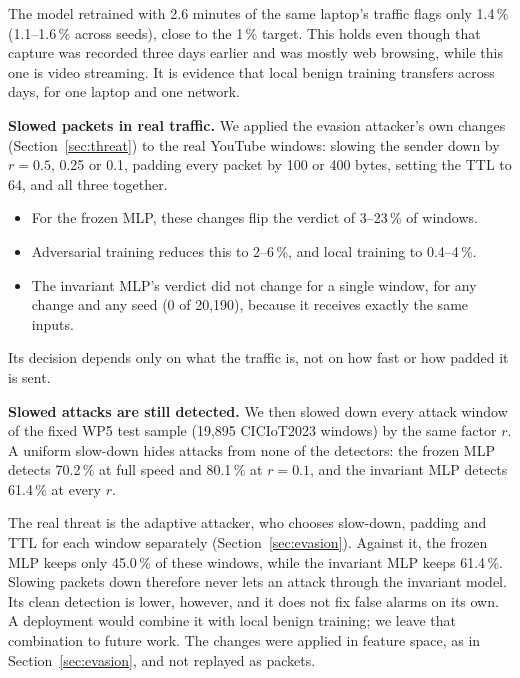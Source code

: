 \documentclass[conference]{IEEEtran}
\begin{document}
The model retrained with 2.6 minutes of the same laptop's traffic flags only 1.4\,\% (1.1--1.6\,\% across seeds), close to the 1\,\% target. This holds even though that capture was recorded three days earlier and was mostly web browsing, while this one is video streaming. It is evidence that local benign training transfers across days, for one laptop and one network.

\textbf{Slowed packets in real traffic.} We applied the evasion attacker's own changes (Section~\ref{sec:threat}) to the real YouTube windows: slowing the sender down by $r=0.5$, 0.25 or 0.1, padding every packet by 100 or 400 bytes, setting the TTL to 64, and all three together.
\begin{itemize}
\item For the frozen MLP, these changes flip the verdict of 3--23\,\% of windows.
\item Adversarial training reduces this to 2--6\,\%, and local training to 0.4--4\,\%.
\item The invariant MLP's verdict did not change for a single window, for any change and any seed (0 of 20,190), because it receives exactly the same inputs.
\end{itemize}
Its decision depends only on what the traffic is, not on how fast or how padded it is sent.

\textbf{Slowed attacks are still detected.} We then slowed down every attack window of the fixed WP5 test sample (19,895 CICIoT2023 windows) by the same factor $r$. A uniform slow-down hides attacks from none of the detectors: the frozen MLP detects 70.2\,\% at full speed and 80.1\,\% at $r=0.1$, and the invariant MLP detects 61.4\,\% at every $r$.

The real threat is the adaptive attacker, who chooses slow-down, padding and TTL for each window separately (Section~\ref{sec:evasion}). Against it, the frozen MLP keeps only 45.0\,\% of these windows, while the invariant MLP keeps 61.4\,\%. Slowing packets down therefore never lets an attack through the invariant model. Its clean detection is lower, however, and it does not fix false alarms on its own. A deployment would combine it with local benign training; we leave that combination to future work. The changes were applied in feature space, as in Section~\ref{sec:evasion}, and not replayed as packets.
\end{document}
